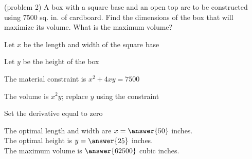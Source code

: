 \documentclass{ximera}
\begin{document}
\begin{problem}(problem 2)
A box with a square base and an open top are to be constructed using 7500 sq. in. of cardboard.  
Find the dimensions of the box that will maximize its volume.  What is the maximum volume?
\begin{hint}
Let $x$ be the length and width of the square base
\end{hint}
\begin{hint}
Let $y$ be the height of the box
\end{hint}
\begin{hint}
The material constraint is $x^2 + 4xy = 7500$
\end{hint}
\begin{hint}
The volume is $x^2 y$; replace $y$ using the constraint
\end{hint}
\begin{hint}
Set the derivative equal to zero
\end{hint}

The optimal length and width are $x = \answer{50}$ inches.\\
The optimal height is $y = \answer{25}$ inches.\\
The maximum volume is $ \answer{62500}$ cubic inches.
\end{problem}
\end{document}
